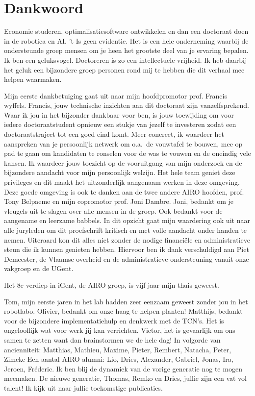 \documentclass[\home/main.tex]{subfiles}
\begin{document}
	
\chapter{Dankwoord}

Economie studeren, optimalisatiesoftware ontwikkelen en dan een doctoraat doen in de robotica en AI. 't Is geen evidentie. Het is een hele onderneming waarbij de ondersteunde groep mensen om je heen het grootste deel van je ervaring bepalen. 
Ik ben een geluksvogel. Doctoreren is zo een intellectuele vrijheid. Ik heb daarbij het geluk een bijzondere groep personen rond mij te hebben die dit verhaal mee helpen waarmaken. 

Mijn eerste dankbetuiging gaat uit naar mijn hoofdpromotor prof. Francis wyffels. Francis, jouw technische inzichten aan dit doctoraat zijn vanzelfsprekend. Waar ik jou in het bijzonder dankbaar voor ben, is jouw toewijding om voor iedere doctoraatstudent opnieuw een stukje van jezelf te investeren zodat een doctoraatstraject tot een goed eind komt. Meer concreet, ik waardeer het aanspreken van je persoonlijk netwerk om o.a.\ de vouwtafel te bouwen, mee op pad te gaan om kandidaten te ronselen voor de was te vouwen en de oneindig vele kansen. Ik waardeer jouw toezicht op de vooruitgang van mijn onderzoek en de bijzondere aandacht voor mijn persoonlijk welzijn. Het hele team geniet deze privileges en dit maakt het uitzonderlijk aangenaam werken in deze omgeving. Deze goede omgeving is ook te danken aan de twee andere AIRO hoofden, prof. Tony Belpaeme en mijn copromotor prof. Joni Dambre. Joni, bedankt om je vleugels uit te slagen over alle mensen in de groep. Ook bedankt voor de aangename en leerzame babbels. In dit opzicht gaat mijn waardering ook uit naar alle juryleden om dit proefschrift kritisch en met volle aandacht onder handen te nemen.
Uiteraard kon dit alles niet zonder de nodige financiële en administratieve steun die ik kunnen genieten hebben. Hiervoor ben ik dank verschuldigd aan Piet Demeester, de Vlaamse overheid en de administratieve ondersteuning vanuit onze vakgroep en de UGent.

Het 8e verdiep in iGent, de AIRO groep, is vijf jaar mijn thuis geweest. 

Tom, mijn eerste jaren in het lab hadden zeer eenzaam geweest zonder jou in het robotlabo. Olivier, bedankt om onze haag te helpen planten!  
Matthijs, bedankt voor de bijzondere implementatiehulp en denkwerk met de TCN's. Het is ongelooflijk wat voor werk jij kan verrichten. Victor, het is gevaarlijk om ons samen te zetten want dan brainstormen we de hele dag! 
In volgorde van ancienniteit: Matthias, Mathieu, Maxime, Pieter, Rembert, Natacha, Peter, Zimcke 
Een aantal AIRO alumni: Lio, Dries, Alexander, Gabriel, Jonas, Ira, Jeroen, Fréderic. Ik ben blij de dynamiek van de vorige generatie nog te mogen meemaken. 
De nieuwe generatie, Thomas, Remko en Dries, jullie zijn een vat vol talent! Ik kijk uit naar jullie toekomstige publicaties. 
\end{document}
